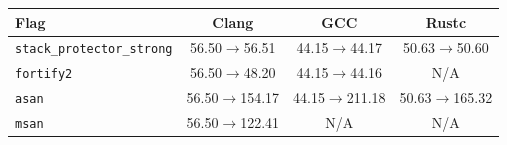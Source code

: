 \begin{tabular*}{\columnwidth}{@{\extracolsep\fill}lccc@{\extracolsep\fill}}
\toprule
\textbf{Flag} & \textbf{Clang} & \textbf{GCC} & \textbf{Rustc} \\
\midrule
\texttt{stack\_protector\_strong} & 56.50$\to$56.51 & 44.15$\to$44.17 & 50.63$\to$50.60 \\
\texttt{fortify2} & 56.50$\to$48.20 & 44.15$\to$44.16 & N/A \\
\texttt{asan} & 56.50$\to$154.17 & 44.15$\to$211.18 & 50.63$\to$165.32 \\
\texttt{msan} & 56.50$\to$122.41 & N/A & N/A \\
\bottomrule
\end{tabular*}
